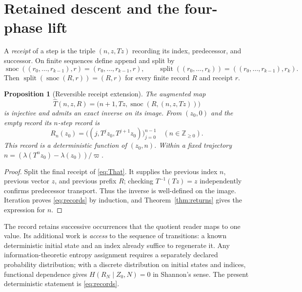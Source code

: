 \documentclass[10pt,letterpaper]{article}
\newtheorem{proposition}[theorem]{Proposition}
\theoremstyle{definition}\newtheorem{definition}[theorem]{Definition}
\newcommand{\ZZ}{\mathbb Z}
\newcommand{\snoc}{\operatorname{snoc}}
\newcommand{\splitop}{\operatorname{split}}
\newcommand{\varp}{\varpi}
\begin{document}
\section{Retained descent and the four-phase lift}\label{sec:history}
A \emph{receipt} of a step is the triple $(n,z,Tz)$ recording its index, predecessor, and successor. On finite sequences define append and split by
\begin{equation}\label{eq:snoc}
 \snoc((r_0,\ldots,r_{k-1}),r)=(r_0,\ldots,r_{k-1},r),\qquad
 \splitop((r_0,\ldots,r_k))=((r_0,\ldots,r_{k-1}),r_k).
\end{equation}
Then $\splitop(\snoc(R,r))=(R,r)$ for every finite record $R$ and receipt $r$.

\begin{proposition}[Reversible receipt extension]\label{prop:record}
The augmented map
\begin{equation}\label{eq:That}
 \widehat T(n,z,R)=\bigl(n+1,Tz,\snoc(R,(n,z,Tz))\bigr)
\end{equation}
is injective and admits an exact inverse on its image. From $(z_0,0)$ and the empty record its $n$-step record is
\begin{equation}\label{eq:records}
 R_n(z_0)=\bigl((j,T^jz_0,T^{j+1}z_0)\bigr)_{j=0}^{n-1}
 \quad(n\in\ZZ_{\ge0}).
\end{equation}
This record is a deterministic function of $(z_0,n)$. Within a fixed trajectory $n=(\lambda(T^nz_0)-\lambda(z_0))/\varp$.
\end{proposition}
\begin{proof}
Split the final receipt of \eqref{eq:That}. It supplies the previous index $n$, previous vector $z$, and previous prefix $R$; checking $T^{-1}(Tz)=z$ independently confirms predecessor transport. Thus the inverse is well-defined on the image. Iteration proves \eqref{eq:records} by induction, and Theorem~\ref{thm:returns} gives the expression for $n$.
\end{proof}

The record retains successive occurrences that the quotient reader maps to one value. Its additional work is \emph{access} to the sequence of transitions: a known deterministic initial state and an index already suffice to regenerate it. Any information-theoretic entropy assignment requires a separately declared probability distribution; with a discrete distribution on initial states and indices, functional dependence gives $H(R_N\mid Z_0,N)=0$ in Shannon's sense. The present deterministic statement is \eqref{eq:records}.
\end{document}
